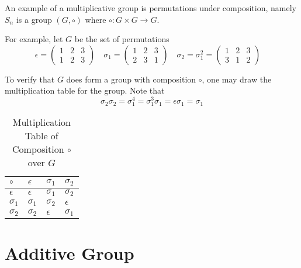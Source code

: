 \begin{remark}
    An example of a multiplicative group is permutations under composition, namely $S_n$ is a group $(G, \circ)$ where $\circ \colon G \times G \to G$.
    
    For example, let $G$ be the set of permutations
    \begin{equation}
    \epsilon = \begin{pmatrix}
        1 & 2 & 3 \\
        1 & 2 & 3
    \end{pmatrix} \quad
    \sigma_1 = \begin{pmatrix}
        1 & 2 & 3 \\
        2 & 3 & 1
    \end{pmatrix} \quad
    \sigma_2 = \sigma_1^2 = \begin{pmatrix}
        1 & 2 & 3 \\
        3 & 1 & 2
    \end{pmatrix} \quad
    \end{equation}
    
    To verify that $G$ does form a group with composition $\circ$, one may draw the multiplication table for the group. Note that
    \begin{equation}
        \sigma_2 \sigma_2 = \sigma_1^4 = \sigma_1^3 \sigma_1 = \epsilon \sigma_1 = \sigma_1
    \end{equation}
    
    \begin{table}[H]
    \centering
    \begin{tabular}{l | l l l}
    \toprule
    $\circ$    & $\epsilon$ & $\sigma_1$ & $\sigma_2$ \\
    \midrule
    $\epsilon$ & $\epsilon$ & $\sigma_1$ & $\sigma_2$ \\
    $\sigma_1$ & $\sigma_1$ & $\sigma_2$ & $\epsilon$ \\
    $\sigma_2$ & $\sigma_2$ & $\epsilon$ & $\sigma_1$ \\
    \bottomrule
    \end{tabular}
    \caption{Multiplication Table of Composition $\circ$ over $G$}
    \end{table}
\end{remark}

\section{Additive Group}

